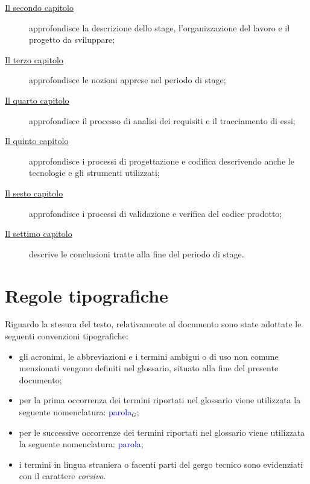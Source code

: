 \begin{description}
    \item[{\hyperref[cap:descrizione-stage]{Il secondo capitolo}}] approfondisce la descrizione dello stage, l'organizzazione del lavoro e il progetto da sviluppare;
    
    \item[{\hyperref[cap:nozioni-apprese]{Il terzo capitolo}}] approfondisce le nozioni apprese nel periodo di stage;
    
    \item[{\hyperref[cap:analisi-requisiti]{Il quarto capitolo}}] approfondisce il processo di analisi dei requisiti e il tracciamento di essi;
    
    \item[{\hyperref[cap:progettazione-codifica]{Il quinto capitolo}}] approfondisce i processi di progettazione e codifica descrivendo anche le tecnologie e gli strumenti utilizzati;
    
    \item[{\hyperref[cap:verifica-validazione]{Il sesto capitolo}}] approfondisce i processi di validazione e verifica del codice prodotto;
    
    \item[{\hyperref[cap:conclusioni]{Il settimo capitolo}}] descrive le conclusioni tratte alla fine del periodo di stage.
\end{description}

\section{Regole tipografiche}

Riguardo la stesura del testo, relativamente al documento sono state adottate le seguenti convenzioni tipografiche:
\begin{itemize}
	\item gli acronimi, le abbreviazioni e i termini ambigui o di uso non comune menzionati vengono definiti nel glossario, situato alla fine del presente documento;
	\item per la prima occorrenza dei termini riportati nel glossario viene utilizzata la seguente nomenclatura: \textcolor{blue}{parola}$_G$;
	\item per le successive occorrenze dei termini riportati nel glossario viene utilizzata la seguente nomenclatura: \textcolor{blue}{parola};
	\item i termini in lingua straniera o facenti parti del gergo tecnico sono evidenziati con il carattere \emph{corsivo}.
\end{itemize}